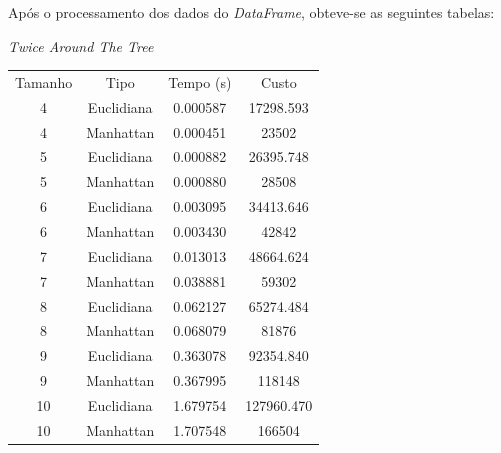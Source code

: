 \documentclass{article}
\begin{document}
Após o processamento dos dados do \textit{DataFrame}, obteve-se as seguintes tabelas:

\begin{center}
	\textit{Twice Around The Tree} \\ [1ex]
	\begin{tabular}{c c c c }
		\hline
		Tamanho & Tipo       & Tempo (s) & Custo      \\ [0.5ex]
		4       & Euclidiana & 0.000587  & 17298.593  \\
		4       & Manhattan  & 0.000451  & 23502      \\
		5       & Euclidiana & 0.000882  & 26395.748  \\
		5       & Manhattan  & 0.000880  & 28508      \\
		6       & Euclidiana & 0.003095  & 34413.646  \\
		6       & Manhattan  & 0.003430  & 42842      \\
		7       & Euclidiana & 0.013013  & 48664.624  \\
		7       & Manhattan  & 0.038881  & 59302      \\
		8       & Euclidiana & 0.062127  & 65274.484  \\
		8       & Manhattan  & 0.068079  & 81876      \\
		9       & Euclidiana & 0.363078  & 92354.840  \\
		9       & Manhattan  & 0.367995  & 118148     \\
		10      & Euclidiana & 1.679754  & 127960.470 \\
		10      & Manhattan  & 1.707548  & 166504     \\ [1ex]
		\hline
	\end{tabular}
\end{center}
\end{document}
